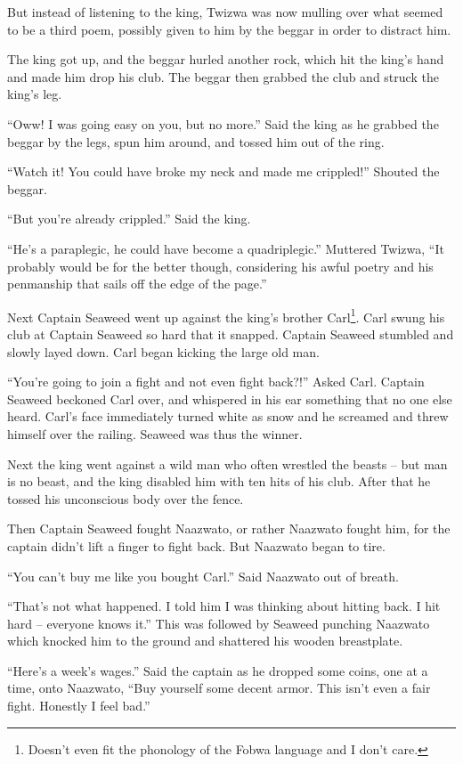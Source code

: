 But instead of listening to the king, Twi\-zwa was now mulling over what seemed to be a third poem, possibly given to him by the beggar in order to distract him.

The king got up, and the beggar hurled another rock, which hit the king's hand and made him drop his club. The beggar then grabbed the club and struck the king's leg.

``Oww! I was going easy on you, but no more.'' Said the king as he grabbed the beggar by the legs, spun him around, and tossed him out of the ring.

``Watch it! You could have broke my neck and made me crippled!'' Shouted the beggar.

``But you're already crippled.'' Said the king.

``He's a paraplegic, he could have become a quadriplegic.'' Muttered Twi\-zwa, ``It probably would be for the better though, considering his awful poetry and his penmanship that sails off the edge of the page.''

Next Captain Seaweed went up against the king's brother Carl\footnote{Doesn't even fit the phonology of the Fobwa language and I don't care.}.
Carl swung his club at Captain Seaweed so hard that it snapped. Captain Seaweed stumbled and slowly layed down. Carl began kicking the large old man.

``You're going to join a fight and not even fight back?!'' Asked Carl. Captain Seaweed beckoned Carl over, and whispered in his ear something that no one else heard. Carl's face immediately turned white as snow and he screamed and threw himself over the railing. Seaweed was thus the winner.

Next the king went against a wild man who often wrestled the beasts -- but man is no beast, and the king disabled him with ten hits of his club. After that he tossed his unconscious body over the fence.

Then Captain Seaweed fought Naa\-zwa\-to, or rather Naa\-zwa\-to fought him, for the captain didn't lift a finger to fight back. But Naa\-zwa\-to began to tire.

``You can't buy me like you bought Carl.'' Said Naa\-zwa\-to out of breath.

``That's not what happened. I told him I was thinking about hitting back. I hit hard -- everyone knows it.'' This was followed by Seaweed punching Naa\-zwa\-to which knocked him to the ground and shattered his wooden breastplate.

``Here's a week's wages.'' Said the captain as he dropped some coins, one at a time, onto Naa\-zwa\-to, ``Buy yourself some decent armor. This isn't even a fair fight. Honestly I feel bad.''

